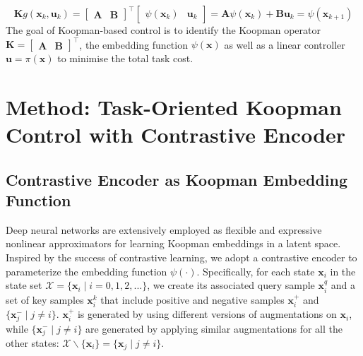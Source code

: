 \documentclass{article}
\begin{document}
\begin{equation}
    \mathbf{K}g(\mathbf{x}_k, \mathbf{u}_k)=
    \begin{bmatrix} \mathbf{A} & \mathbf{B} \end{bmatrix}^\top \begin{bmatrix} \psi(\mathbf{x}_k) & \mathbf{u}_k\end{bmatrix}=
    \mathbf{A}\psi(\mathbf{x}_k) + \mathbf{B}\mathbf{u}_k = \psi(\mathbf{x}_{k+1})
\label{eq:kpm2linearAB}
\end{equation}
The goal of Koopman-based control is to identify the Koopman operator $\mathbf{K} = 
\begin{bmatrix}
    \mathbf{A} & \mathbf{B}
\end{bmatrix}^\top$, the embedding function $\psi(\mathbf{x})$ as well as a linear controller $\mathbf{u}=\pi(\mathbf{x})$  to minimise the total task cost.



\section{Method: Task-Oriented Koopman Control with Contrastive Encoder}
\label{sec:method}
\subsection{Contrastive Encoder as Koopman Embedding Function}
Deep neural networks are extensively employed as flexible and expressive nonlinear approximators for learning Koopman embeddings in a latent space. Inspired by the success of contrastive learning, we adopt a contrastive encoder to parameterize the embedding function $\psi(\cdot)$. Specifically, for each state $\mathbf{x}_i$ in the state set $\mathcal{X}=\{\mathbf{x}_i \mid i=0,1,2,...\}$, we create its associated query sample $\mathbf{x}_i^q$ and a set of key samples $\mathbf{x}_i^k$ that include positive and negative samples $\mathbf{x}_i^+$ and $\{\mathbf{x}_j^- \mid j \neq i\}$.   $\mathbf{x}_i^+$ is generated by using different versions of augmentations on $\mathbf{x}_i$, while $\{\mathbf{x}_j^- \mid j \neq i\}$ are generated by applying similar augmentations for all the other states: $\mathcal{X} \backslash \{\mathbf{x}_i\} = \{\mathbf{x}_j \mid j \neq i\}$.
\end{document}

